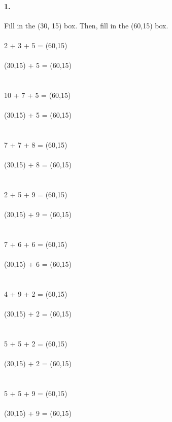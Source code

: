 \documentclass[12pt]{article}
\begin{document}
\paragraph{1.}
Fill in the \framebox(30, 15){} box. Then, fill in the \framebox(60,15){} box.\\
\\
2 + 3 + 5 = \framebox(60,15){}
\\
\\
\framebox(30,15){} + 5 = \framebox(60,15){}
\\
\\
\\
10 + 7 + 5 = \framebox(60,15){}
\\
\\
\framebox(30,15){} + 5 = \framebox(60,15){}
\\
\\
\\
7 + 7 + 8 = \framebox(60,15){}
\\
\\
\framebox(30,15){} + 8 = \framebox(60,15){}
\\
\\
\\
2 + 5 + 9 = \framebox(60,15){}
\\
\\
\framebox(30,15){} + 9 = \framebox(60,15){}
\\
\\
\\
7 + 6 + 6 = \framebox(60,15){}
\\
\\
\framebox(30,15){} + 6 = \framebox(60,15){}
\\
\\
\\
4 + 9 + 2 = \framebox(60,15){}
\\
\\
\framebox(30,15){} + 2 = \framebox(60,15){}
\\
\\
\\
5 + 5 + 2 = \framebox(60,15){}
\\
\\
\framebox(30,15){} + 2 = \framebox(60,15){}
\\
\\
\\
5 + 5 + 9 = \framebox(60,15){}
\\
\\
\framebox(30,15){} + 9 = \framebox(60,15){}
\\
\\
\end{document}
